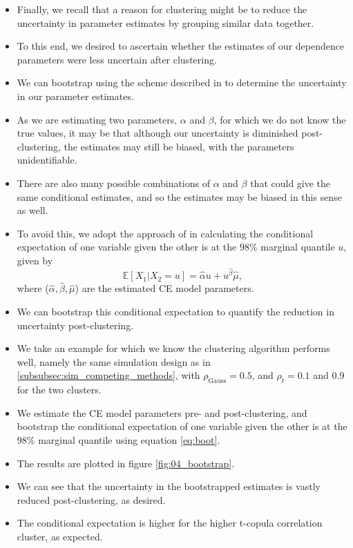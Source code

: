 \documentclass{article}
\numberwithin{equation}{section}
\begin{document}
\begin{itemize}
  \item Finally, we recall that a reason for clustering might be to reduce the uncertainty in parameter estimates by grouping similar data together.
  \item To this end, we desired to ascertain whether the estimates of our dependence parameters were less uncertain after clustering.
  \item We can bootstrap using the scheme described in \cite{Heffernan2004} to determine the uncertainty in our parameter estimates. 
  \item As we are estimating two parameters, $\alpha$ and $\beta$, for which we do not know the true values, it may be that although our uncertainty is diminished post-clustering, the estimates may still be biased, with the parameters unidentifiable.
  \item There are also many possible combinations of $\alpha$ and $\beta$ that could give the same conditional estimates, and so the estimates may be biased in this sense as well.
  \item To avoid this, we adopt the approach of \cite{Richards2021-qm} in calculating the conditional expectation of one variable given the other is at the $98\%$ marginal quantile $u$, given by
  \begin{equation} \label{eq:boot}
    \mathbb{E}[X_1 | X_2 = u] = \hat{\alpha} u + u^{\hat{\beta}} \hat{\mu},
  \end{equation}
  where ($\hat{\alpha}, \hat{\beta}, \hat{\mu}$) are the estimated CE model parameters.
  \item We can bootstrap this conditional expectation to quantify the reduction in uncertainty post-clustering. 
\end{itemize}

\begin{itemize}
  \item We take an example for which we know the clustering algorithm performs well, namely the same simulation design as in \ref{subsubsec:sim_competing_methods}, with $\rho_{\text{Gauss}} = 0.5$, and $\rho_{t} = 0.1$ and $0.9$ for the two clusters.
  \item We estimate the CE model parameters pre- and post-clustering, and bootstrap the conditional expectation of one variable given the other is at the $98\%$ marginal quantile using equation \ref{eq:boot}.
  \item The results are plotted in figure \ref{fig:04_bootstrap}.
  \item We can see that the uncertainty in the bootstrapped estimates is vastly reduced post-clustering, as desired.
  \item The conditional expectation is higher for the higher t-copula correlation cluster, as expected.

\end{itemize}
\end{document}
